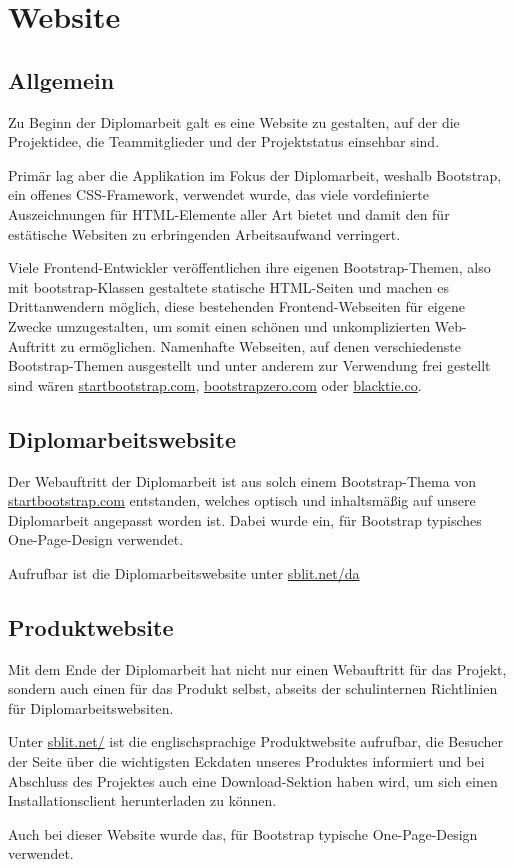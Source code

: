 \chapter{Website}
\section{Allgemein}
Zu Beginn der Diplomarbeit galt es eine Website zu gestalten, auf der die Projektidee, die Teammitglieder und der
Projektstatus einsehbar sind.

Primär lag aber die Applikation im Fokus der Diplomarbeit, weshalb Bootstrap,
ein offenes CSS-Framework, verwendet wurde, das viele vordefinierte
Auszeichnungen für HTML-Elemente aller Art bietet und damit den für estätische
Websiten zu erbringenden Arbeitsaufwand verringert.

Viele Frontend-Entwickler veröffentlichen ihre eigenen Bootstrap-Themen, also
mit bootstrap-Klassen gestaltete statische HTML-Seiten und machen es Drittanwendern
möglich, diese bestehenden Frontend-Webseiten für eigene Zwecke umzugestalten,
um somit einen schönen und unkomplizierten Web-Auftritt zu ermöglichen. Namenhafte
Webseiten, auf denen verschiedenste Bootstrap-Themen ausgestellt und unter
anderem zur Verwendung frei gestellt sind wären \href{http://startbootstrap.com/}{startbootstrap.com},
\href{http://bootstrapzero.com/}{bootstrapzero.com} oder \href{http://blacktie.co/}{blacktie.co}.

\section{Diplomarbeitswebsite}
Der Webauftritt der Diplomarbeit ist aus solch einem Bootstrap-Thema von
\href{http://startbootstrap.com/}{startbootstrap.com} entstanden, welches optisch und inhaltsmäßig auf unsere
Diplomarbeit angepasst worden ist. Dabei wurde ein, für Bootstrap typisches
One-Page-Design verwendet.

Aufrufbar ist die Diplomarbeitswebsite unter \href{http://sblit.net/da/}{sblit.net/da}

\section{Produktwebsite}
Mit dem Ende der Diplomarbeit hat \sblit nicht nur einen Webauftritt für das Projekt,
sondern auch einen für das Produkt selbst, abseits der schulinternen Richtlinien für Diplomarbeitswebsiten.

Unter \href{http://sblit.net/}{sblit.net/} ist die englischsprachige Produktwebsite aufrufbar,
die Besucher der Seite über die wichtigsten Eckdaten unseres Produktes informiert und bei
Abschluss des Projektes auch eine Download-Sektion haben wird, um sich einen Installationsclient herunterladen zu können.

Auch bei dieser Website wurde das, für Bootstrap typische One-Page-Design verwendet.
